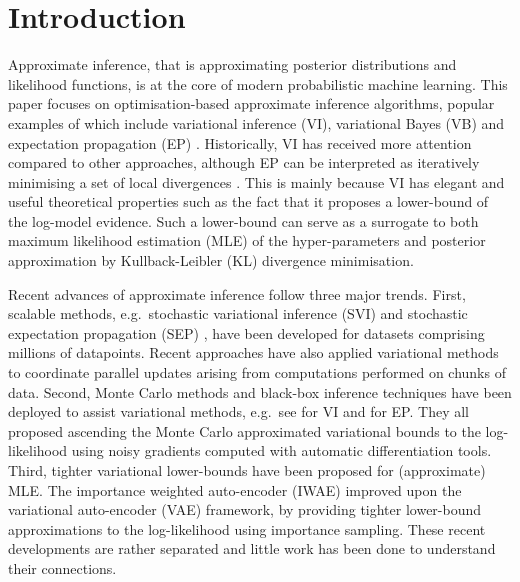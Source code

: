 \section{Introduction}
Approximate inference, that is approximating posterior distributions and likelihood functions, is at the core of modern probabilistic machine learning. This paper focuses on optimisation-based approximate inference algorithms, popular examples of which include variational inference (VI), variational Bayes (VB) \cite{jordan:vi, beal:thesis} and expectation propagation (EP) \cite{minka:ep, opper:ec}. Historically, VI has received more attention compared to other approaches, although EP can be interpreted as iteratively minimising a set of local divergences \cite{minka:divergence}. This is mainly because VI has elegant and useful theoretical properties such as the fact that it proposes a lower-bound of the log-model evidence. Such a lower-bound can serve as a surrogate to both maximum likelihood estimation (MLE) of the hyper-parameters and posterior approximation by Kullback-Leibler (KL) divergence minimisation.


Recent advances of approximate inference follow three major trends.
%
First, scalable methods, e.g.~stochastic variational inference (SVI) \cite{hoffman:svi} and stochastic expectation propagation (SEP) \cite{li:sep, barthelme:aep}, have been developed for datasets comprising millions of datapoints. Recent approaches \cite{broderick:stream, gelman:dep, xu:sms} have also applied variational methods to coordinate parallel updates arising from computations performed on chunks of data.
%
Second, Monte Carlo methods and black-box inference techniques have been deployed to assist variational methods, e.g.~see \cite{paisley:bbvi, salimans:reparam, ranganath:bbvi, kucukelbir:vi_stan} for VI and \cite{hernandez-lobato:bb-alpha} for EP. They all proposed ascending the Monte Carlo approximated variational bounds to the log-likelihood using noisy gradients computed with automatic differentiation tools.
%
Third, tighter variational lower-bounds have been proposed for (approximate) MLE. The importance weighted auto-encoder (IWAE) \cite{burda:iwae} improved upon the variational auto-encoder (VAE) \cite{kingma:vae, rezende:vae} framework, by providing tighter lower-bound approximations to the log-likelihood using importance sampling. 
%
These recent developments are rather separated and little work has been done to understand their connections.

